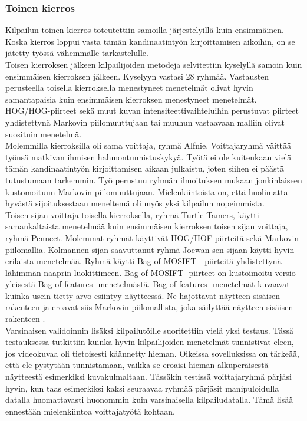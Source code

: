 \subsubsection {Toinen kierros}

Kilpailun toinen kierros toteutettiin samoilla järjestelyillä kuin ensimmäinen. Koska kierros loppui
vasta tämän kandinaatintyön kirjoittamisen aikoihin, on se jätetty työssä vähemmälle tarkastelulle.\\

Toisen kierroksen jälkeen kilpailijoiden metodeja selvitettiin kyselyllä samoin kuin ensimmäisen
kierroksen jälkeen. Kyselyyn vastasi 28 ryhmää. Vastausten perusteella toisella kierroksella menestyneet 
menetelmät olivat hyvin samantapaisia kuin ensimmäisen kierroksen menestyneet menetelmät. HOG/HOG-piirteet sekä muut
kuvan intensiteettivaihteluihin perustuvat piirteet yhdistettynä Markovin piilomuuttujaan tai muuhun
vastaavaan malliin olivat suosituin menetelmä.\\

Molemmilla kierroksilla oli sama voittaja, ryhmä Alfnie. 
Voittajaryhmä väittää työnsä matkivan ihmisen hahmontunnistuskykyä. Työtä ei ole kuitenkaan vielä tämän kandinaatintyön kirjoittamisen aikaan julkaistu, joten siihen ei päästä tutustumaan tarkemmin. Työ perustuu
ryhmän ilmoituksen mukaan jonkinlaiseen kustomoituun Markovin piilomuuttujaan. Mielenkiintoista on,
että huolimatta hyvästä sijoituksestaan meneltemä oli myös yksi kilpailun nopeimmista.\\

Toisen sijan voittaja toisella kierroksella, ryhmä Turtle Tamers, käytti samankaltaista menetelmää kuin 
ensimmäisen kierroksen toisen sijan voittaja, ryhmä Pennect. Molemmat ryhmät käyttivät HOG/HOF-piirteitä sekä Markovin piilomallia. 
Kolmannen sijan saavuttanut ryhmä Joewan sen sijaan käytti hyvin erilaista menetelmää. Ryhmä käytti Bag of MOSIFT -
piirteitä yhdistettynä lähimmän naaprin luokittimeen. Bag of MOSIFT -piirteet on kustoimoitu versio
yleisestä Bag of features -menetelmästä. Bag of features -menetelmät kuvaavat kuinka usein tietty 
arvo esiintyy näytteessä. Ne hajottavat näytteen sisäisen rakenteen ja eroavat siis Markovin piilomallista,
joka säilyttää näytteen sisäisen rakenteen \citep{}. \\

Varsinaisen validoinnin lisäksi kilpailutöille suoritettiin vielä yksi testaus. Tässä testauksessa tutkittiin kuinka 
hyvin kilpailijoiden menetelmät tunnistivat eleen, jos videokuvaa oli tietoisesti käännetty hieman. Oikeissa sovelluksissa on tärkeää,
että ele pystytään tunnistamaan, vaikka se eroaisi hieman alkuperäisestä näytteestä esimerkiksi kuvakulmaltaan. 
Tässäkin testissä voittajaryhmä pärjäsi hyvin, kun taas esimerkiksi kaksi seuraavaa ryhmää pärjäsit manipuloidulla datalla huomattavasti
huonommin kuin varsinaisella kilpailudatalla. Tämä lisää ennestään mielenkiintoa voittajatyötä kohtaan.



